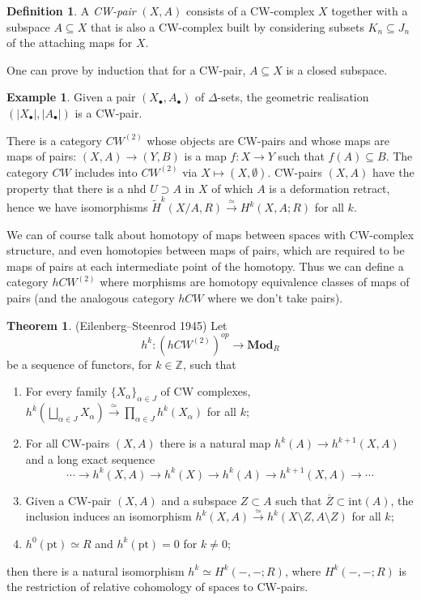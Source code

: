\documentclass{tufte-handout}
\def\pt {\mathrm{pt}}
\def\Mod {\mathbf{Mod}}
\def\ZZ{\mathbb{Z}}
\theoremstyle{definition}
\newtheorem{definition}{Definition}
\newtheorem{example}{Example}
\newtheorem{theorem}{Theorem}
\begin{document}
\begin{definition}
A \emph{CW-pair} $(X,A)$ consists of a CW-complex $X$ together with a subspace $A\subseteq X$ that is also
a CW-complex built by considering subsets $K_n \subseteq J_n$ of the attaching maps for $X$.
\end{definition}

One can prove by induction that for a CW-pair, $A\subseteq X$ is a closed subspace.

\begin{example}
Given a pair $(X_\bullet,A_\bullet)$ of $\Delta$-sets, the geometric realisation $(|X_\bullet|,|A_\bullet|)$ is a CW-pair.
\end{example}

There is a category $CW^{(2)}$ whose objects are CW-pairs and whose maps are maps of pairs: $(X,A) \to (Y,B)$ is a map $f\colon X\to Y$ such that $f(A) \subseteq B$.
The category $CW$ includes into $CW^{(2)}$ via $X\mapsto (X,\emptyset)$.
CW-pairs $(X,A)$ have the property that there is a nhd $U \supset A$ in $X$ of which $A$ is a deformation retract, hence
we have isomorphisms $\widetilde{H}^k(X/A,R) \xrightarrow{\simeq}H^k(X,A;R)$ for all $k$. 

We can of course talk about homotopy of maps between spaces with CW-complex structure, and even 
homotopies between maps of pairs, which are required to be maps of pairs at each intermediate point 
of the homotopy. Thus we can define a category $hCW^{(2)}$ where morphisms are homotopy equivalence
classes of maps of pairs (and the analogous category $hCW$ where we don't take pairs).

\begin{theorem}{(Eilenberg--Steenrod 1945)}
Let 
\[
h^k\colon \left(hCW^{(2)}\right)^{op} \to \Mod_R
\]
be a sequence of functors, for $k\in \ZZ$, such that
\begin{enumerate}
\item For every family $\{X_\alpha\}_{\alpha\in J}$ of CW complexes, $h^k(\bigsqcup_{\alpha\in J} X_\alpha) \xrightarrow{\simeq} \prod_{\alpha\in J} h^k(X_\alpha)$ for all $k$;
\item For all CW-pairs $(X,A)$ there is a natural map $h^k(A) \to h^{k+1}(X,A)$ and a long exact sequence
\[
\cdots \to h^k(X,A) \to h^k(X) \to h^k(A) \to h^{k+1}(X,A) \to \cdots
\]
\item Given a CW-pair $(X,A)$ and a subspace $Z\subset A$ such that $\overline{Z} \subset \mathrm{int}(A)$, the inclusion induces an isomorphism $h^k(X,A) \xrightarrow{\simeq} h^k(X\setminus Z,A\setminus Z)$ for all $k$;
\item $h^0(\pt)\simeq R$ and $h^k(\pt) = 0$ for $k\neq 0$;
\end{enumerate}
then there is a natural isomorphism $h^k \simeq H^k(-,-;R)$, where $H^k(-,-;R)$ is the restriction of relative cohomology of spaces to CW-pairs.
\end{theorem}
\end{document}
